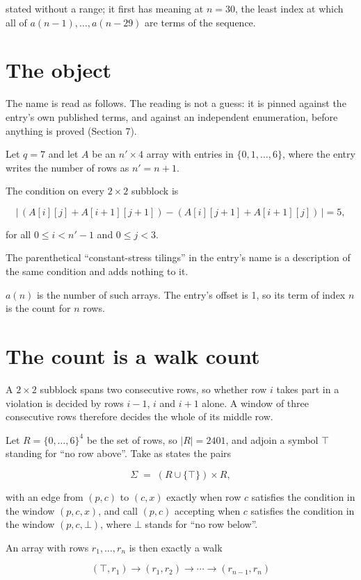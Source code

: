 \documentclass[11pt]{article}
\theoremstyle{definition}
\begin{document}
stated without a range; it first has meaning at $n = 30$, the least index at which all of $a(n-1),\dots,a(n-29)$ are terms of the sequence.

\section{The object}

The name is read as follows. The reading is not a guess: it is pinned against the entry's own published terms, and against an independent enumeration, before anything is proved (Section 7).

Let $q = 7$ and let $A$ be an $n' \times 4$ array with entries in $\{0,1,\dots,6\}$, where the entry writes the number of rows as $n' = n + 1$.

The condition on every $2 \times 2$ subblock is

\[\bigl|\,(A[i][j] + A[i{+}1][j{+}1]) - (A[i][j{+}1] + A[i{+}1][j])\,\bigr| = 5,\]

for all $0 \le i < n'-1$ and $0 \le j < 3$.

The parenthetical ``constant-stress tilings'' in the entry's name is a description of the same condition and adds nothing to it.

$a(n)$ is the number of such arrays. The entry's offset is 1, so its term of index $n$ is the count for $n$ rows.

\section{The count is a walk count}

A $2 \times 2$ subblock spans two consecutive rows, so whether row $i$ takes part in a violation is decided by rows $i-1$, $i$ and $i+1$ alone. A window of three consecutive rows therefore decides the whole of its middle row.

Let $R = \{0,\dots,6\}^{4}$ be the set of rows, so $|R| = 2401$, and adjoin a symbol $\top$ standing for ``no row above''. Take as states the pairs

\[\Sigma \;=\; (R \cup \{\top\}) \times R,\]

with an edge from $(p,c)$ to $(c,x)$ exactly when row $c$ satisfies the condition in the window $(p,c,x)$, and call $(p,c)$ accepting when $c$ satisfies the condition in the window $(p,c,\bot)$, where $\bot$ stands for ``no row below''.

An array with rows $r_1,\dots,r_n$ is then exactly a walk

\[(\top,r_1) \to (r_1,r_2) \to \cdots \to (r_{n-1},r_n)\]
\end{document}
